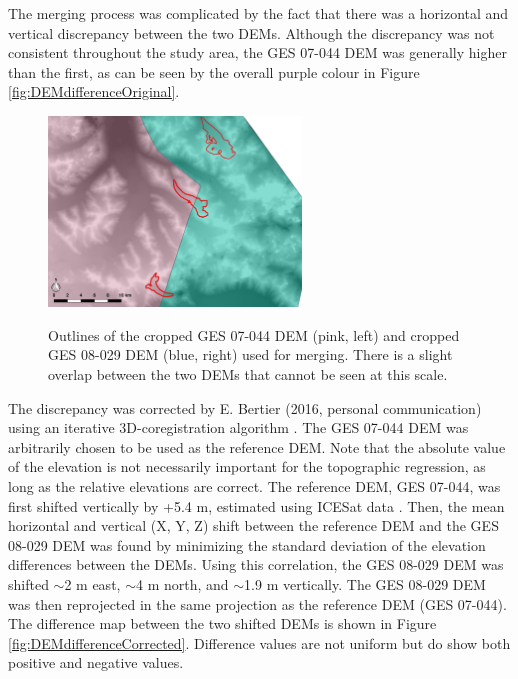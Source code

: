 \documentclass[12pt]{article}
\begin{document}
The merging process was complicated by the fact that there was a horizontal and vertical discrepancy between the two DEMs. Although the discrepancy was not consistent throughout the study area, the GES 07-044 DEM was generally higher than the first, as can be seen by the overall purple colour in Figure \ref{fig:DEMdifferenceOriginal}. 


\begin{figure}
	\centering
	\includegraphics[width = 0.6\textwidth]{mergeLine.jpeg}\\
	\caption{Outlines of the cropped GES 07-044 DEM (pink, left) and cropped GES 08-029 DEM (blue, right) used for merging. There is a slight overlap between the two DEMs that cannot be seen at this scale.}
	\label{fig:mergeLine}
\end{figure}

The discrepancy was corrected by E. Bertier (2016, personal communication) using an iterative 3D-coregistration algorithm \citep{Berthier2007}. The GES 07-044 DEM was arbitrarily chosen to be used as the reference DEM. Note that the absolute value of the elevation is not necessarily important for the topographic regression, as long as the relative elevations are correct. The reference DEM, GES 07-044, was first shifted vertically by +5.4 m, estimated using ICESat data \citep{Berthier2010}. Then, the mean horizontal and vertical (X, Y, Z) shift between the reference DEM and the GES 08-029 DEM was found by minimizing the standard deviation of the elevation differences between the DEMs. Using this correlation, the GES 08-029 DEM  was shifted $\sim$2 m east, $\sim$4 m north, and $\sim$1.9 m vertically. The GES 08-029 DEM was then reprojected in the same projection as the reference DEM (GES 07-044). The difference map between the two shifted DEMs is shown in Figure \ref{fig:DEMdifferenceCorrected}. Difference values are not uniform but do show both positive and negative values.
\end{document}
